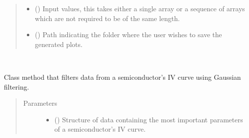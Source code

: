 \documentclass[letterpaper,10pt,english,openany, oneside]{sphinxmanual}
\begin{document}
\begin{fulllineitems}
\begin{fulllineitems}
\begin{quote}
\begin{description}
\begin{itemize}
\item {} 
 (\sphinxstyleliteralemphasis{\sphinxupquote{, }}\sphinxstyleliteralemphasis{\sphinxupquote{ (}}\sphinxstyleliteralemphasis{\sphinxupquote{,}}\sphinxstyleliteralemphasis{\sphinxupquote{)}}) \textendash{} Input values, this takes either a single array or a sequence of arrays
which are not required to be of the same length.

\item {} 
 (\sphinxstyleliteralemphasis{\sphinxupquote{, }}) \textendash{} Path indicating the folder where the user wishes to save the generated plots.

\end{itemize}

\end{description}\end{quote}

\end{fulllineitems}


\begin{fulllineitems}
\label{\detokenize{index:fompy.plots.plotter.iv}}~

\begin{fulllineitems}
Class method that filters data from a semiconductor’s IV curve using Gaussian filtering.

\end{fulllineitems}

\begin{quote}\begin{description}
\item[{Parameters}] \leavevmode\begin{itemize}
\item {} 
 () \textendash{} Structure of data containing the most important parameters of a semiconductor’s IV curve.


\end{itemize}
\end{description}
\end{quote}
\end{fulllineitems}
\end{fulllineitems}
\end{document}
